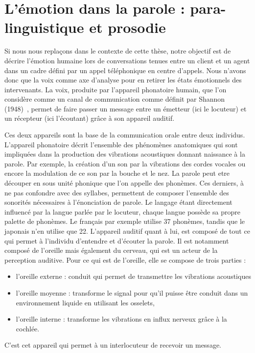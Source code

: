 \section{L'émotion dans la parole : para-linguistique et prosodie}
Si nous nous replaçons dans le contexte de cette thèse, notre objectif est de décrire l'émotion humaine lors de conversations tenues entre un client et un agent dans un cadre défini par un appel téléphonique en centre d'appels. Nous n'avons donc que la voix comme axe d'analyse pour en retirer les états émotionnels des intervenants.
La voix, produite par l'appareil phonatoire humain, que l'on considère comme un canal de communication comme définit par Shannon (1948)~\cite{Shannon1948}, permet de faire passer un message entre un émetteur (ici le locuteur) et un récepteur (ici l'écoutant) grâce à son appareil auditif.

Ces deux appareils sont la base de la communication orale entre deux individus. L'appareil phonatoire décrit l'ensemble des phénomènes anatomiques qui sont impliquées dans la production des vibrations acoustiques donnant naissance à la parole. Par exemple, la création d'un son par la vibrations des cordes vocales ou encore la modulation de ce son par la bouche et le nez. La parole peut etre découper en sous unité phonique que l'on appelle des phonèmes. Ces derniers, à ne pas confondre avec des syllabes, permettent de composer l'ensemble des sonorités nécessaires à l'énonciation de parole.
Le langage étant directement influencé par la langue parlée par le locuteur, chaque langue possède sa propre palette de phonèmes. Le français par exemple utilise 37 phonèmes, tandis que le japonais n'en utilise que 22.
L'appareil auditif quant à lui, est composé de tout ce qui permet à l'individu d'entendre et d'écouter la parole. Il est notamment composé de l'oreille mais également du cerveau, qui est un acteur de la perception auditive. Pour ce qui est de l'oreille, elle se compose de trois parties :
\begin{itemize}
  \item l'oreille externe : conduit qui permet de transmettre les vibrations acoustiques
  \item l'oreille moyenne : transforme le signal pour qu'il puisse être conduit dans un environnement liquide en utilisant les osselets,
  \item l'oreille interne : transforme les vibrations en influx nerveux grâce à la cochlée.
\end{itemize}
C'est cet appareil qui permet à un interlocuteur de recevoir un message.

